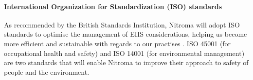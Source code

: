 \paragraph{International Organization for
Standardization (ISO) standards}

As recommended by the British Standards Institution, Nitroma will adopt ISO standards to optimise the management of EHS considerations, helping us become more efficient and sustainable with regards to our practises \cite{british_standards_institution_benefits_nodate}. ISO 45001 (for occupational health and safety) and ISO 14001 (for environmental management) are two standards that will enable Nitroma to improve their approach to safety of people and the environment. 
